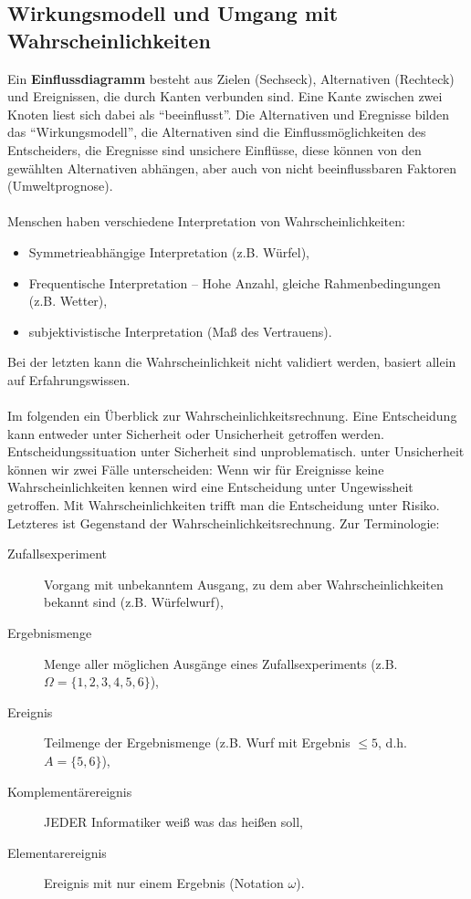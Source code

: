 \subsection{Wirkungsmodell und Umgang mit Wahrscheinlichkeiten}
Ein \textbf{Einflussdiagramm} besteht aus Zielen (Sechseck), Alternativen (Rechteck) und Ereignissen, die durch Kanten verbunden sind. Eine Kante zwischen zwei Knoten liest sich dabei als ``beeinflusst''. Die Alternativen und Eregnisse bilden das ``Wirkungsmodell'', die Alternativen sind die Einflussmöglichkeiten des Entscheiders, die Eregnisse sind unsichere Einflüsse, diese können von den gewählten Alternativen abhängen, aber auch von nicht beeinflussbaren Faktoren (Umweltprognose).\\
\ \\
Menschen haben verschiedene Interpretation von Wahrscheinlichkeiten:
\begin{itemize}
	\item Symmetrieabhängige Interpretation (z.B. Würfel),
	\item Frequentische Interpretation -- Hohe Anzahl, gleiche Rahmenbedingungen (z.B. Wetter),
	\item subjektivistische Interpretation (Maß des Vertrauens).
\end{itemize}
Bei der letzten kann die Wahrscheinlichkeit nicht validiert werden, basiert allein auf Erfahrungswissen.\\
\ \\
Im folgenden ein Überblick zur Wahrscheinlichkeitsrechnung. Eine Entscheidung kann entweder unter Sicherheit oder Unsicherheit getroffen werden. Entscheidungssituation unter Sicherheit sind unproblematisch. unter Unsicherheit können wir zwei Fälle unterscheiden: Wenn wir für Ereignisse keine Wahrscheinlichkeiten kennen wird eine Entscheidung unter Ungewissheit getroffen. Mit Wahrscheinlichkeiten trifft man die Entscheidung unter Risiko. Letzteres ist Gegenstand der Wahrscheinlichkeitsrechnung. Zur Terminologie:
\begin{description}
	\item[Zufallsexperiment] Vorgang mit unbekanntem Ausgang, zu dem aber Wahrscheinlichkeiten bekannt sind (z.B. Würfelwurf),
	\item[Ergebnismenge] Menge aller möglichen Ausgänge eines Zufallsexperiments (z.B. \(\Omega=\{1,2,3,4,5,6\}\)),
	\item[Ereignis] Teilmenge der Ergebnismenge (z.B. Wurf mit Ergebnis \(\leq 5\), d.h. \(A=\{5,6\}\)),
	\item[Komplementärereignis] JEDER Informatiker weiß was das heißen soll,
	\item[Elementarereignis] Ereignis mit nur einem Ergebnis (Notation \(\omega\)).
\end{description}
